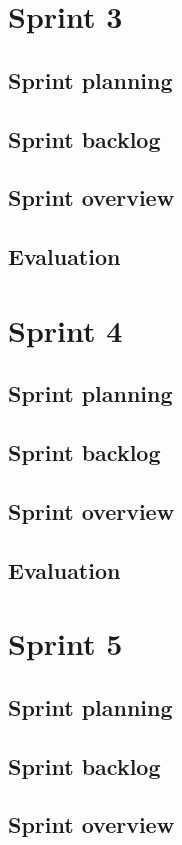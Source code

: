 \documentclass[11pt,a4paper,titlepage,oneside]{report}
\begin{document}
\chapter{Sprint 3}
\section{Sprint planning}
\section{Sprint backlog}
\section{Sprint overview}
\section{Evaluation}

\chapter{Sprint 4}
\section{Sprint planning}
\section{Sprint backlog}
\section{Sprint overview}
\section{Evaluation}

\chapter{Sprint 5}
\section{Sprint planning}
\section{Sprint backlog}
\section{Sprint overview}
\end{document}
